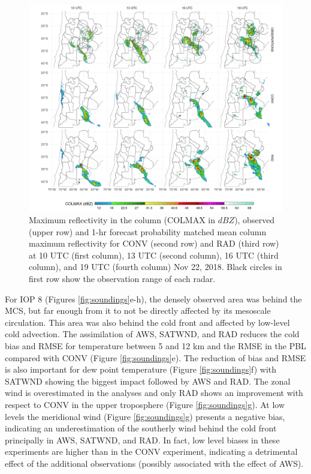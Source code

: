 \documentclass[final,5p,times,twocolumn,authoryear]{elsarticle} %
\begin{document}
\begin{figure}[ht]
\includegraphics[width=1\linewidth]{../figures/dbz-mean-1} \caption{Maximum reflectivity in the column (COLMAX in \(dBZ\)), observed (upper row) and 1-hr forecast probability matched mean column maximum reflectivity for CONV (second row) and RAD (third row) at 10 UTC (first column), 13 UTC (second column), 16 UTC (third column), and 19 UTC (fourth column) Nov 22, 2018. Black circles in first row show the observation range of each radar.}\label{fig:dbz-mean}
\end{figure}

For IOP 8 (Figures \ref{fig:soundings}e-h), the densely observed area was behind the MCS, but far enough from it to not be directly affected by its mesoscale circulation. This area was also behind the cold front and affected by low-level cold advection. The assimilation of AWS, SATWND, and RAD reduces the cold bias and RMSE for temperature between 5 and 12 km and the RMSE in the PBL compared with CONV (Figure \ref{fig:soundings}e). The reduction of bias and RMSE is also important for dew point temperature (Figure \ref{fig:soundings}f) with SATWND showing the biggest impact followed by AWS and RAD. The zonal wind is overestimated in the analyses and only RAD shows an improvement with respect to CONV in the upper troposphere (Figure \ref{fig:soundings}g). At low levels the meridional wind (Figure \ref{fig:soundings}g) presents a negative bias, indicating an underestimation of the southerly wind behind the cold front principally in AWS, SATWND, and RAD. In fact, low level biases in these experiments are higher than in the CONV experiment, indicating a detrimental effect of the additional observations (possibly associated with the effect of AWS).
\end{document}
